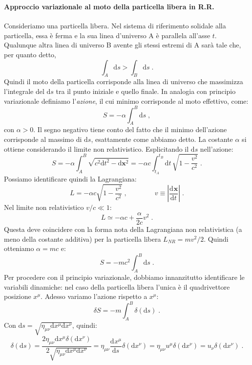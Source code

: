 \documentclass[12pt,a4paper]{report}
\theoremstyle{definition}
\newcommand{\dev}[3][]{\frac{\mathrm{d}^{#1} #2}{\mathrm{d} #3^{#1}}}
\newcommand{\diff}[1][]{\mathrm{d}#1}
\begin{document}
\textbf{Approccio variazionale al moto della particella libera in R.R.} \\
\\
Consideriamo una particella libera. Nel sistema di riferimento solidale alla particella, essa è ferma e la sua linea d'universo A è parallela all'asse $t$. Qualunque altra linea di universo B avente gli stessi estremi di A sarà tale che, per quanto detto,
$$
\int_A\diff{s}>\int_B\diff{s}\;.
$$
Quindi il moto della particella corrisponde alla linea di universo che massimizza l'integrale del $\diff{s}$ tra il punto iniziale e quello finale. In analogia con principio variazionale definiamo l'\emph{azione}, il cui minimo corrisponde al moto effettivo, come:
\begin{equation}
S=-\alpha\int_A^B\diff{s}\;,
\end{equation}
con $\alpha>0$. Il segno negativo tiene conto del fatto che il minimo dell'azione corrisponde al massimo di $\diff{s}$, esattamente come abbiamo detto. La costante $\alpha$ si ottiene considerando il limite non relativistico. Esplicitando il $\diff{s}$ nell'azione:
\begin{equation}
S=-\alpha\int_A^B\sqrt{c^2\diff{t}^2-\diff{\mathbf{x}^2}}=-\alpha c\int_{t_A}^{t_B}\diff{t}\,\sqrt{1-\frac{v^2}{c^2}}\;.
\end{equation}
Possiamo identificare quindi la Lagrangiana:
\begin{equation}
L=-\alpha c\sqrt{1-\frac{v^2}{c^2}}\;,\qquad \qquad v\equiv \left|\dev{\mathbf{x}}{t}\right|\;.
\end{equation}
Nel limite non relativistico $v/c\ll 1$:
\begin{equation}
L\simeq -\alpha c+\frac{\alpha}{2c}v^2\;.
\end{equation}
Questa deve coincidere con la forma nota della Lagrangiana non relativistica (a meno della costante additiva) per la particella libera $L_{NR}=mv^2/2$. Quindi otteniamo $\alpha=mc$ e:
\begin{equation}
S=-mc^2\int_A^B\diff{s}\;.
\end{equation}
Per procedere con il principio variazionale, dobbiamo innanzitutto identificare le variabili dinamiche: nel caso della particella libera l'unica è il quadrivettore posizione $x^{\mu}$. Adesso variamo l'azione rispetto a $x^{\mu}$:
$$
\delta S=-m\int_A^B \delta(\diff{s})\;.
$$
Con $\diff{s}=\sqrt{\eta_{\mu\nu}\diff{x^{\mu}}\diff{x^{\nu}}}$, quindi:
\begin{equation}
\delta(\diff{s}) = \frac{2\eta_{\mu\nu}\diff{x^{\mu}}\delta(\diff{x^{\nu}})}{2\sqrt{\eta_{\mu\nu}\diff{x^{\mu}}\diff{x^{\nu}}}}=\eta_{\mu\nu}\dev{x^{\mu}}{s}\delta(\diff{x^{\nu}})=\eta_{\mu\nu}u^{\mu}\delta(\diff{x^{\nu}})=u_{\nu}\delta(\diff{x^{\nu}})\;.
\end{equation}
\end{document}
